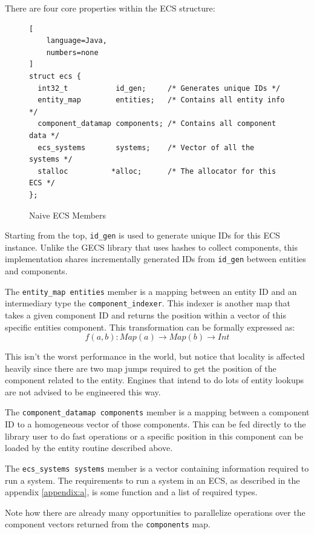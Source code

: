 There are four core properties within the ECS structure:

\begin{figure}[H]
\begin{lstlisting}[
    language=Java,
    numbers=none
]
struct ecs {
  int32_t           id_gen;     /* Generates unique IDs */
  entity_map        entities;   /* Contains all entity info */
  component_datamap components; /* Contains all component data */
  ecs_systems       systems;    /* Vector of all the systems */
  stalloc          *alloc;      /* The allocator for this ECS */
};
\end{lstlisting}
    \caption{Naive ECS Members}
    \label{code:naive_ecs_data}
\end{figure}

Starting from the top, \texttt{id\_gen} is used to generate unique IDs for this ECS instance. Unlike the GECS library that uses hashes to collect components, this implementation shares incrementally generated IDs from \texttt{id\_gen} between entities and components.

The \texttt{entity\_map entities} member is a mapping between an entity ID and an intermediary type the \texttt{component\_indexer}. This indexer is another map that takes a given component ID and returns the position within a vector of this specific entities component. This transformation can be formally expressed as:
\begin{equation*}
    f(a, b) : Map(a) \rightarrow Map(b) \rightarrow Int
\end{equation*}

This isn't the worst performance in the world, but notice that locality is affected heavily since there are two map jumps required to get the position of the component related to the entity. Engines that intend to do lots of entity lookups are not advised to be engineered this way. 

The \texttt{component\_datamap components} member is a mapping between a component ID to a homogeneous vector of those components. This can be fed directly to the library user to do fast operations or a specific position in this component can be loaded by the entity routine described above.

The \texttt{ecs\_systems systems} member is a vector containing information required to run a system. The requirements to run a system in an ECS, as described in the appendix \ref{appendix:a}, is some function and a list of required types. 

Note how there are already many opportunities to parallelize operations over the component vectors returned from the \texttt{components} map.

